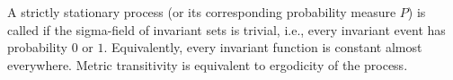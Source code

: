 A strictly stationary process (or its corresponding probability measure $P$) is called  if the sigma-field of invariant sets is trivial, i.e., every invariant event has probability $0$ or $1$. Equivalently, every invariant function is constant almost everywhere. Metric transitivity is equivalent to ergodicity of the process.
